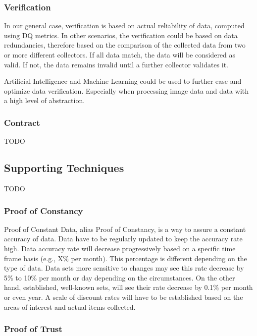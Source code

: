 \subsubsection{Verification}

In our general case, verification is based on actual reliability of data, computed using DQ metrics.
In other scenarios, the verification could be based on data redundancies, therefore based on the comparison of the collected data from two or more different collectors.
If all data match, the data will be considered as valid.
If not, the data remains invalid until a further collector validates it.

Artificial Intelligence and Machine Learning could be used to further ease and optimize data verification.
Especially when processing image data and data with a high level of abstraction.

\subsubsection{Contract}

TODO

\subsection{Supporting Techniques}

TODO

\subsubsection{Proof of Constancy}

Proof of Constant Data, alias Proof of Constancy, is a way to assure a constant accuracy of data.
Data have to be regularly updated to keep the accuracy rate high.
Data accuracy rate will decrease progressively based on a specific time frame basis (e.g., X\% per month).
This percentage is different depending on the type of data.
Data sets more sensitive to changes may see this rate decrease by 5\% to 10\% per month or day depending on the circumstances.
On the other hand, established, well-known sets, will see their rate decrease by 0.1\% per month or even year.
A scale of discount rates will have to be established based on the areas of interest and actual items collected.

\subsubsection{Proof of Trust}

